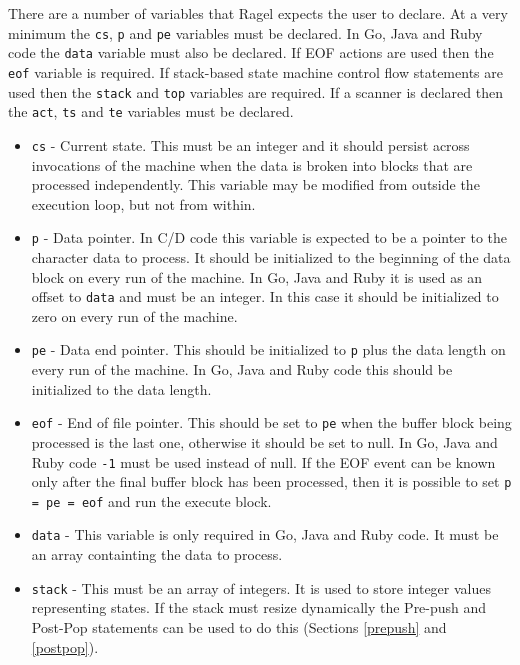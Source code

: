 \documentclass[letterpaper,11pt,oneside]{book}
\begin{document}
There are a number of variables that Ragel expects the user to declare. At a
very minimum the \verb|cs|, \verb|p| and \verb|pe| variables must be declared.
In Go, Java and Ruby code the \verb|data| variable must also be declared. If
EOF actions are used then the \verb|eof| variable is required. If
stack-based state machine control flow statements are used then the
\verb|stack| and \verb|top| variables are required. If a scanner is declared
then the \verb|act|, \verb|ts| and \verb|te| variables must be
declared.

\begin{itemize}

\item \verb|cs| - Current state. This must be an integer and it should persist
across invocations of the machine when the data is broken into blocks that are
processed independently. This variable may be modified from outside the
execution loop, but not from within.

\item \verb|p| - Data pointer. In C/D code this variable is expected to be a
pointer to the character data to process. It should be initialized to the
beginning of the data block on every run of the machine. In Go, Java and Ruby it is
used as an offset to \verb|data| and must be an integer. In this case it should
be initialized to zero on every run of the machine.

\item \verb|pe| - Data end pointer. This should be initialized to \verb|p| plus
the data length on every run of the machine. In Go, Java and Ruby code this should
be initialized to the data length.

\item \verb|eof| - End of file pointer. This should be set to \verb|pe| when
the buffer block being processed is the last one, otherwise it should be set to
null. In Go, Java and Ruby code \verb|-1| must be used instead of null. If the EOF
event can be known only after the final buffer block has been processed, then
it is possible to set \verb|p = pe = eof| and run the execute block.

\item \verb|data| - This variable is only required in Go, Java and Ruby code. It
must be an array containting the data to process.

\item \verb|stack| - This must be an array of integers. It is used to store
integer values representing states. If the stack must resize dynamically the
Pre-push and Post-Pop statements can be used to do this (Sections
\ref{prepush} and \ref{postpop}).


\end{itemize}
\end{document}
